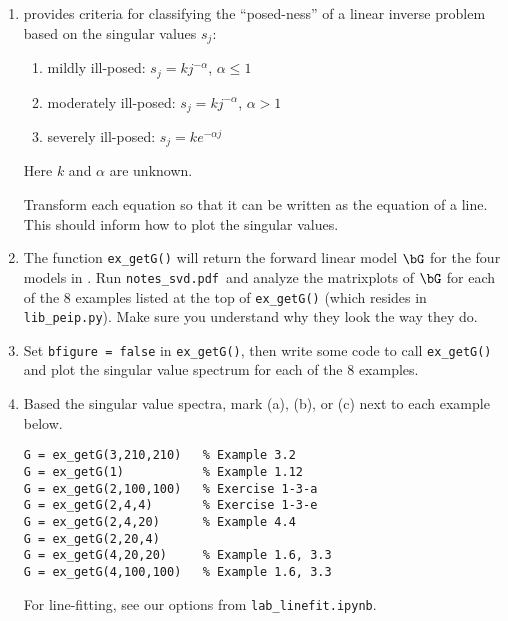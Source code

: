 \documentclass[11pt,titlepage,fleqn]{article}
\newcommand{\nfile}{{\tt notes\_svd.pdf}}
\begin{document}
\begin{enumerate}

\item \citet[][Section~3.5, p.~74]{Aster} provides criteria for classifying the ``posed-ness'' of a linear inverse problem based on the singular values $s_j$:
%
\begin{enumerate}
\renewcommand{\theenumi}{\Alph{enumi}}
\item mildly ill-posed: $s_j = k j^{-\alpha}$, $\alpha \le 1$
\item moderately ill-posed: $s_j = k j^{-\alpha}$, $\alpha > 1$
\item severely ill-posed: $s_j = k e^{-\alpha j}$
\end{enumerate}
%
Here $k$ and $\alpha$ are unknown.

Transform each equation so that it can be written as the equation of a line. This should inform how to plot the singular values.

\item The function \verb+ex_getG()+ will return the forward linear model $\bG$ for the four models in \citet{Aster}. Run \nfile\ and analyze the matrixplots of $\bG$ for each of the 8 examples listed at the top of \verb+ex_getG()+ (which resides in \verb+lib_peip.py+). Make sure you understand why they look the way they do.

\item Set \verb+bfigure = false+ in \verb+ex_getG()+, then write some code to call \verb+ex_getG()+ and plot the singular value spectrum for each of the 8 examples.

\pagebreak
\item Based the singular value spectra, mark (a), (b), or (c) next to each example below.
%
\begin{spacing}{1.5}
\begin{verbatim}
G = ex_getG(3,210,210)   % Example 3.2
G = ex_getG(1)           % Example 1.12
G = ex_getG(2,100,100)   % Exercise 1-3-a
G = ex_getG(2,4,4)       % Exercise 1-3-e
G = ex_getG(2,4,20)      % Example 4.4
G = ex_getG(2,20,4)
G = ex_getG(4,20,20)     % Example 1.6, 3.3
G = ex_getG(4,100,100)   % Example 1.6, 3.3
\end{verbatim}
\end{spacing}
%
For line-fitting, see our options from \verb+lab_linefit.ipynb+.

\end{enumerate}


\end{document}
